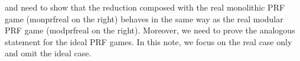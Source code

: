 \documentclass[a4paper]{article}
\begin{document}
\noindent
and need to show that the reduction composed with the real monolithic PRF game (monprfreal on the right) behaves in the same way as the real modular PRF game (modprfreal on the right). Moreover, we need to prove the analogous statement for the ideal PRF games. In this note, we focus on the real case only and omit the ideal case.



%
%
%
%
%
%
\end{document}
